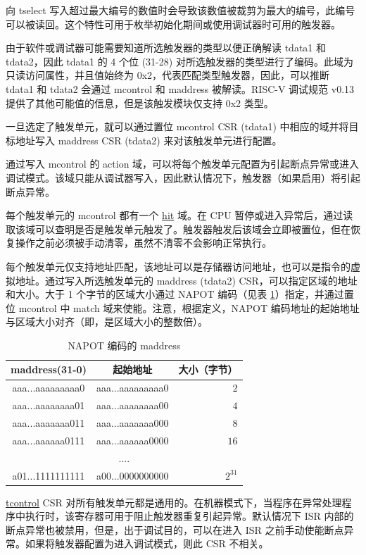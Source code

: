 \documentclass[main\_\_CN.tex]{subfiles}
\begin{document}
向 tselect 写入超过最大编号的数值时会导致该数值被裁剪为最大的编号，此编号可以被读回。这个特性可用于枚举初始化期间或使用调试器时可用的触发器。

由于软件或调试器可能需要知道所选触发器的类型以便正确解读 tdata1 和 tdata2，因此 tdata1 的 4 个位 (31-28) 对所选触发器的类型进行了编码。此域为只读访问属性，并且值始终为 0x2，代表匹配类型触发器，因此，可以推断 tdata1 和 tdata2 会通过 mcontrol 和 maddress 被解读。RISC-V 调试规范 v0.13 提供了其他可能值的信息，但是该触发模块仅支持 0x2 类型。

一旦选定了触发单元，就可以通过置位 mcontrol CSR (tdata1) 中相应的域并将目标地址写入 maddress CSR (tdata2) 来对该触发单元进行配置。

通过写入 mcontrol 的 action 域，可以将每个触发单元配置为引起断点异常或进入调试模式。该域只能从调试器写入，因此默认情况下，触发器（如果启用）将引起断点异常。

每个触发单元的 mcontrol 都有一个 \hyperref[fielddesc:MCONTROLHIT]{hit} 域。在 CPU 暂停或进入异常后，通过读取该域可以查明是否是触发单元触发了。触发器触发后该域会立即被置位，但在恢复操作之前必须被手动清零，虽然不清零不会影响正常执行。

每个触发单元仅支持地址匹配，该地址可以是存储器访问地址，也可以是指令的虚拟地址。通过写入所选触发单元的 maddress (tdata2) CSR，可以指定区域的地址和大小。大于 1 个字节的区域大小通过 NAPOT 编码（见表 \ref{tab:riscvcpu-hwt-table}）指定，并通过置位 mcontrol 中 match 域来使能。注意，根据定义，NAPOT 编码地址的起始地址与区域大小对齐（即，是区域大小的整数倍）。

\begin{longtable}{ | c | c | r | }
\caption{NAPOT 编码的 maddress} \label{tab:riscvcpu-hwt-table}
\\ \hline
\rowcolor{lightgray}
maddress(31-0) & 起始地址 & 大小（字节） \\ \hline
aaa...aaaaaaaaa0 & aaa...aaaaaaaaa0 & $2$ \\ \hline
aaa...aaaaaaaa01 & aaa...aaaaaaaa00 & $4$ \\ \hline
aaa...aaaaaaa011 & aaa...aaaaaaa000 & $8$ \\ \hline
aaa...aaaaaa0111 & aaa...aaaaaa0000 & $16$ \\ \hline
\multicolumn{3}{c}{....} \\ \hline
a01...1111111111 & a00...0000000000 & $2^{31}$ \\ \hline
\end{longtable}

\hyperref[regdesc:TCONTROL]{tcontrol} CSR 对所有触发单元都是通用的。在机器模式下，当程序在异常处理程序中执行时，该寄存器可用于阻止触发器重复引起异常。默认情况下 ISR 内部的断点异常也被禁用，但是，出于调试目的，可以在进入 ISR 之前手动使能断点异常。如果将触发器配置为进入调试模式，则此 CSR 不相关。
\end{document}
